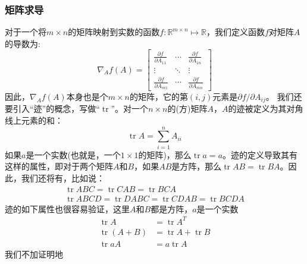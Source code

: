 \documentclass[hyperref, UTF8]{ctexart}
\DeclareMathOperator{\tr}{tr}
\begin{document}
\subsubsection{矩阵求导}
对于一个将$m \times n$的矩阵映射到实数的函数$f:\mathbb R^{m \times n} \mapsto \mathbb R$，我们定义函数$f$对矩阵$A$的导数为:
\begin{equation}
\nabla_Af(A) = 
\begin{bmatrix}
\frac{\partial f}{\partial A_{11}} & \cdots & \frac{\partial f}{\partial A_{1n}} \\
\vdots & \ddots & \vdots \\
\frac{\partial f}{\partial A_{m1}} & \cdots & \frac{\partial f}{\partial A_{mn}}
\end{bmatrix}
\end{equation}
因此，$\nabla_Af(A)$本身也是个$m \times n$的矩阵，它的第$(i, j)$元素是$\partial f/\partial A_{ij}$。
我们还要引入“迹”的概念，写做``$\tr$''。对一个$n \times n$的(方)矩阵$A$，$A$的迹被定义为其对角线上元素的和：
\begin{equation}
\tr A = \sum_{i = 1}^nA_{ii}
\end{equation}
如果$a$是一个实数(也就是，一个$1 \times 1$的矩阵)，那么$\tr a = a$。迹的定义导致其有这样的属性，即对于两个矩阵$A$和$B$，如果$AB$是方阵，那么$\tr AB = \tr BA$。因此，我们还将有，比如说：
\begin{gather*}
\tr ABC = \tr CAB = \tr BCA \\
\tr ABCD = \tr DABC = \tr CDAB = \tr BCDA
\end{gather*}
迹的如下属性也很容易验证，这里$A$和$B$都是方阵，$a$是一个实数
\begin{align}
\tr A &= \tr A^T \\
\tr (A + B) &= \tr A + \tr B \\
\tr aA &= a\tr A
\end{align}
我们不加证明地
\end{document}
